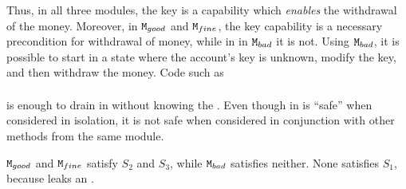 \begin{example}
Thus, in all three modules, the key is a capability which \emph{enables} the withdrawal of the money. 
Moreover, in $\mbox{\normalfont{\texttt{M}}}_{{good}}$ and $\mbox{\normalfont{\texttt{M}}}_{{fine}}$, the key capability
is a necessary precondition for withdrawal of money, while in %
 in $\mbox{\normalfont{\texttt{M}}}_{{bad}}$ it is not. %
Using $\mbox{\normalfont{\texttt{M}}}_{{bad}}$, it is possible to start in a state where the account's key is unknown, modify the key, and then withdraw the money. 
Code   such as 
\\ 
$\ \strut \hspace{.2in} $  
\\ 
is enough to drain   in \ModB without knowing the \password.
Even though %
 in  \ModB is ``safe'' when considered in isolation, it is not safe when considered in conjunction with other methods from the same module. 

$\mbox{\normalfont{\texttt{M}}}_{{good}}$ and $\mbox{\normalfont{\texttt{M}}}_{{fine}}$ satisfy $S_2$ and $S_3$, while $\mbox{\normalfont{\texttt{M}}}_{{bad}}$ satisfies neither. None satisfies $S_1$, because   leaks an .

\end{example}
 


